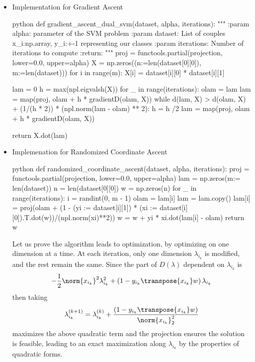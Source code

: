 \documentclass[math, info]{cours}
\begin{document}
\begin{itemize}
	\item Implementation for Gradient Ascent
		\begin{code}{python}
def gradient_ascent_dual_svm(dataset, alpha, iterations):
    """
    :param alpha: parameter of the SVM problem
    :param dataset: List of couples x_{i}:np.array, y_{i}:+-1 representing our classes
    :param iterations: Number of iterations to compute
    :return:
    """
    proj = functools.partial(projection, lower=0.0, upper=alpha)
    X = np.zeros((n:=len(dataset[0][0]), m:=len(dataset)))
    for i in range(m):
        X[i] = dataset[i][0] * dataset[i][1]

    lam = 0
    h = max(npl.eigvalsh(X))
    for _ in range(iterations):
        olam = lam
        lam = map(proj, olam + h * gradientD(olam, X))
        while d(lam, X) > d(olam, X) + (1/(h * 2)) * (npl.norm(lam - olam) ** 2):
            h = h /2
            lam = map(proj, olam + h * gradientD(olam, X))

    return X.dot(lam)
		\end{code}
	\item Implemenation for Randomized Coordinate Ascent
		\begin{code}{python}
def randomized_coordinate_ascent(dataset, alpha, iterations):
    proj = functools.partial(projection, lower=0.0, upper=alpha)
    lam = np.zeros(m:= len(dataset))
    n = len(dataset[0][0])
    w = np.zeros(n)
    for _ in range(iterations):
        i = randint(0, m - 1)
        olam = lam[i]
        lam = lam.copy()
        lam[i] = proj(olam + (1 - (yi := dataset[i][1]) * (xi := dataset[i][0]).T.dot(w))/(npl.norm(xi)**2))
        w = w + yi * xi.dot(lam[i] - olam)
    return w
\end{code}
Let us prove the algorithm leads to optimization, by optimizing on one dimension at a time.
At each iteration, only one dimension $\lambda_{i_{k}}$ is modified, and the rest remain the same. Since the part of $D\left( \lambda \right)$ dependent on $\lambda_{i_{k}}$ is
\begin{equation*}
	-\frac{1}{2}\norm{x_{i_{k}}}^{2}\lambda_{i_{k}}^{2} + \left( 1 - y_{i_{k}}\transpose{x_{i_{k}}}w \right)\lambda_{i_{k}}
\end{equation*}
then taking
\begin{equation*}
	\lambda_{i_{k}}^{(k + 1)} = \lambda_{i_{k}}^{(k)} + \frac{\left( 1 - y_{i_{k}}\transpose{x_{i_{k}}}w \right)}{\norm{x_{i_{k}}}_{2}^{2}}
\end{equation*}
maximizes the above quadratic term and the projection ensures the solution is feasible, leading to an exact maximization along $\lambda_{i_{k}}$ by the properties of quadratic forms.
\end{itemize}
\end{document}
